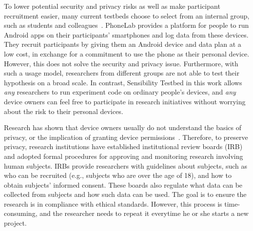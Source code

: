 To lower potential security and privacy risks as well as make  
participant recruitment easier, many current testbeds choose to 
select from an internal group, such as students and 
colleagues~\cite{hao2013isleep, wang2012no, 
wang2013sensing}. PhoneLab provides a platform for 
people to run Android apps on their participants' smartphones 
and log data from these devices. They recruit participants by 
giving them an Android device and data plan at a low cost, in 
exchange for a commitment to use the phone as their personal 
device. However, this does not solve the security and privacy issue. 
Furthermore, with such a usage model, researchers from different  
groups are not able to test their hypothesis on a broad scale.
In contrast, Sensibility Testbed in this work
allows \textit{any} researchers to run experiment code on ordinary people's 
devices, and \textit{any} device owners can feel free to 
participate in research initiatives without worrying about the risk 
to their personal devices.

Research has shown that device owners usually do not understand the 
basics of privacy, or the implication of granting device 
permissions~\cite{camp2015respecting}. 
Therefore, to preserve privacy, research institutions have established 
institutional review boards (IRB) \cite{irb} and adopted formal 
procedures for approving and monitoring research involving 
human subjects. IRBs provide researchers with guidelines about 
subjects, such as who can be recruited (e.g., subjects
who are over the age of 18), and 
how to obtain subjects' informed consent. These boards also 
regulate what data can be collected from subjects and how 
such data can be used. The goal is
to ensure the research is in compliance with ethical standards. 
However, this process is time-consuming, and the researcher needs 
to repeat it everytime he or she starts a new project. 

